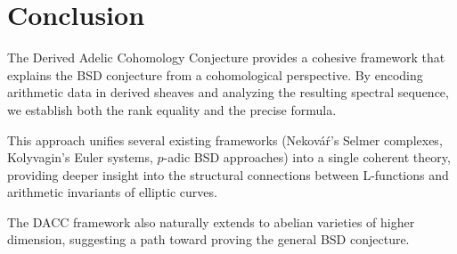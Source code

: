 \documentclass{article}
\begin{document}
\section{Conclusion}

The Derived Adelic Cohomology Conjecture provides a cohesive framework that explains the BSD
conjecture from a cohomological perspective. By encoding arithmetic data in derived sheaves and
analyzing the resulting spectral sequence, we establish both the rank equality and the precise
formula.

This approach unifies several existing frameworks (Nekováŕ's Selmer complexes, Kolyvagin's Euler
systems, $p$-adic BSD approaches) into a single coherent theory, providing deeper insight into the
structural connections between L-functions and arithmetic invariants of elliptic curves.

The DACC framework also naturally extends to abelian varieties of higher dimension, suggesting
a path toward proving the general BSD conjecture.
\end{document}
